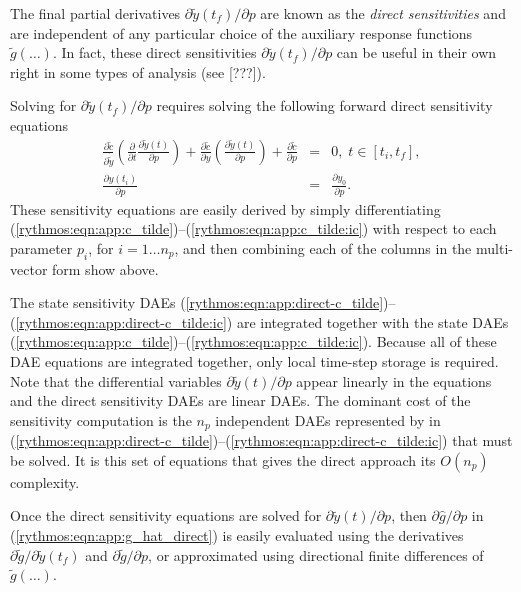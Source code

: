 \documentclass[pdf,ps2pdf,11pt]{SANDreport}
\begin{document}
The final partial derivatives $\partial \tilde{y}(t_f) / {}\partial p$ are
known as the {}\textit{direct sensitivities} and are independent of any
particular choice of the auxiliary response functions $\tilde{g}(\ldots)$.
In fact, these direct sensitivities $\partial \tilde{y}(t_f) / {}\partial p$
can be useful in their own right in some types of analysis (see [???]).

Solving for $\partial \tilde{y}(t_f) / {}\partial p$ requires solving the
following forward direct sensitivity equations
%
\begin{eqnarray}
%
\frac{\partial \tilde{c}}{\partial \dot{\tilde{y}}} \left(\frac{\partial}{\partial t} \frac{\partial \tilde{y}(t)}{\partial p} \right)
+ \frac{\partial \tilde{c}}{\partial y} \left(\frac{\partial \tilde{y}(t)}{\partial p}\right)
+ \frac{\partial \tilde{c}}{\partial p} & = & 0, \; t \in \left[ t_i, t_f \right], \label{rythmos:eqn:app:direct-c_tilde} \\
\frac{\partial y(t_i)}{\partial p} & = & \frac{\partial y_0}{\partial p}. \label{rythmos:eqn:app:direct-c_tilde:ic}
\end{eqnarray}
%
These sensitivity equations are easily derived by simply differentiating
(\ref{rythmos:eqn:app:c_tilde})--(\ref{rythmos:eqn:app:c_tilde:ic}) with
respect to each parameter $p_i$, for $i = 1 {}\ldots n_p$, and then combining
each of the columns in the multi-vector form show above.

The state sensitivity DAEs
(\ref{rythmos:eqn:app:direct-c_tilde})--(\ref{rythmos:eqn:app:direct-c_tilde:ic})
are integrated together with the state DAEs
(\ref{rythmos:eqn:app:c_tilde})--(\ref{rythmos:eqn:app:c_tilde:ic}).  Because
all of these DAE equations are integrated together, only local time-step
storage is required.  Note that the differential variables ${}\partial
\tilde{y}(t) / {}\partial p$ appear linearly in the equations and the
direct sensitivity DAEs are linear DAEs.  The dominant cost of the sensitivity
computation is the $n_p$ independent DAEs represented by in
(\ref{rythmos:eqn:app:direct-c_tilde})--(\ref{rythmos:eqn:app:direct-c_tilde:ic})
that must be solved.  It is this set of equations that gives the direct
approach its $O(n_p)$ complexity.

Once the direct sensitivity equations are solved for ${}\partial \tilde{y}(t)
/ {}\partial p$, then $\partial {}\hat{g} / {}\partial p$ in
(\ref{rythmos:eqn:app:g_hat_direct}) is easily evaluated using the derivatives
$\partial \tilde{g} / {}\partial \tilde{y}(t_f)$ and $\partial \tilde{g} /
{}\partial p$, or approximated using directional finite differences of
$\tilde{g}(\ldots)$.
\end{document}
